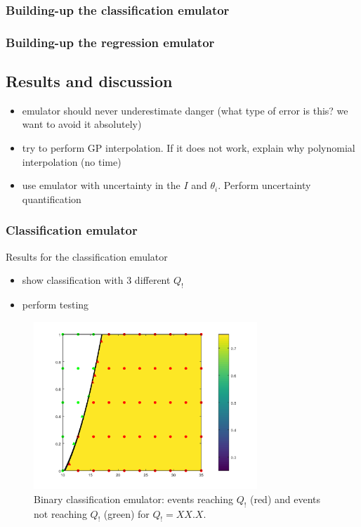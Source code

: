 \subsubsection{Building-up the classification emulator}


\subsubsection{Building-up the regression emulator}


\subsection{Results and discussion}

\begin{itemize}
\itemsep0em
  \item emulator should never underestimate danger (what type of error is this? we want to avoid it absolutely)
  \item try to perform GP interpolation. If it does not work, explain why polynomial interpolation (no time)
  \item use emulator with uncertainty in the $I$ and $\theta_i$. Perform uncertainty quantification
\end{itemize}


\subsubsection{Classification emulator}

Results for the classification emulator
\begin{itemize}
  \item show classification with 3 different $Q_!$
  \item perform testing 
\end{itemize}

\begin{figure}[htpb]
  \centering
  \includegraphics[width=0.75\textwidth]{Figures/classification.png}
  \caption{Binary classification emulator: events reaching $Q_!$ (red) and events not reaching $Q_!$ (green) for $Q_! = XX.X$.}
  \label{fig:classification_Q1}
\end{figure}


